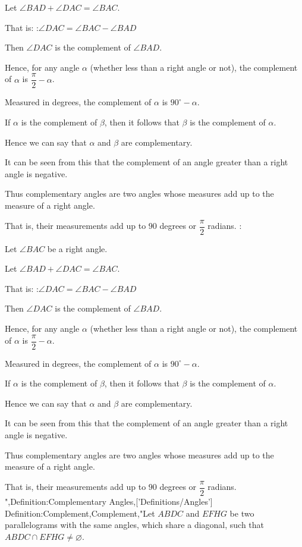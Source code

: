 Let $\angle BAD + \angle DAC = \angle BAC$.

That is:
:$\angle DAC = \angle BAC - \angle BAD$


Then $\angle DAC$ is the complement of $\angle BAD$.


Hence, for any angle $\alpha$ (whether less than a right angle or not), the complement of $\alpha$ is $\dfrac \pi 2 - \alpha$.

Measured in degrees, the complement of $\alpha$ is $90^\circ - \alpha$.


If $\alpha$ is the complement of $\beta$, then it follows that $\beta$ is the complement of $\alpha$.

Hence we can say that $\alpha$ and $\beta$ are complementary.


It can be seen from this that the complement of an angle greater than a right angle is negative.


Thus complementary angles are two angles whose measures add up to the measure of a right angle.

That is, their measurements add up to $90$ degrees or $\dfrac \pi 2$ radians.
:

Let $\angle BAC$ be a right angle.

Let $\angle BAD + \angle DAC = \angle BAC$.

That is:
:$\angle DAC = \angle BAC - \angle BAD$


Then $\angle DAC$ is the complement of $\angle BAD$.


Hence, for any angle $\alpha$ (whether less than a right angle or not), the complement of $\alpha$ is $\dfrac \pi 2 - \alpha$.

Measured in degrees, the complement of $\alpha$ is $90^\circ - \alpha$.


If $\alpha$ is the complement of $\beta$, then it follows that $\beta$ is the complement of $\alpha$.

Hence we can say that $\alpha$ and $\beta$ are complementary.


It can be seen from this that the complement of an angle greater than a right angle is negative.


Thus complementary angles are two angles whose measures add up to the measure of a right angle.

That is, their measurements add up to $90$ degrees or $\dfrac \pi 2$ radians.
",Definition:Complementary Angles,['Definitions/Angles']
Definition:Complement,Complement,"Let $ABDC$ and $EFHG$ be two parallelograms with the same angles, which share a diagonal, such that $ABDC \cap EFHG \ne \varnothing$.

